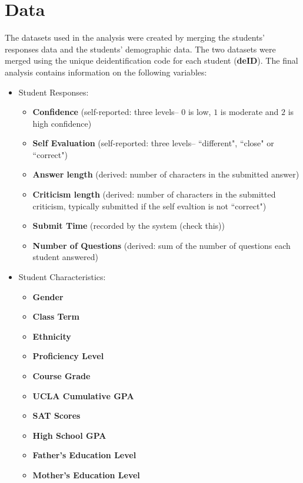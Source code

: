 \documentclass[11pt]{article} %
\title{}
\begin{document}
\maketitle
\section{Data}
The datasets used in the analysis were created by merging the students' responses data and the students' demographic data. The two datasets were merged using the unique deidentification code for each student (\textbf{deID}). The final analysis contains information on the following variables:

\begin{itemize}
\item Student Responses:
\begin{itemize}
\item \textbf{Confidence} (self-reported: three levels-- $0$ is low, $1$ is moderate and $2$ is high confidence)
\item \textbf{Self Evaluation} (self-reported: three levels-- ``different", ``close" or ``correct")
\item \textbf{Answer length} (derived: number of characters in the submitted answer)
\item \textbf{Criticism length} (derived: number of characters in the submitted criticism, typically submitted if the self evaltion is not ``correct")
\item \textbf{Submit Time} (recorded by the system (check this))
\item \textbf{Number of Questions} (derived: sum of the number of questions each student answered)
\end{itemize}
\item Student Characteristics:
\begin{itemize}
\item \textbf{Gender }
\item \textbf{Class Term} 
\item \textbf{Ethnicity }
\item \textbf{Proficiency Level} 
\item \textbf{Course Grade}
\item \textbf{UCLA Cumulative GPA}
\item \textbf{SAT Scores}
\item \textbf{High School GPA}
\item \textbf{Father's Education Level}
\item \textbf{Mother's Education Level} 
\end{itemize}


\end{itemize}
\end{document}
